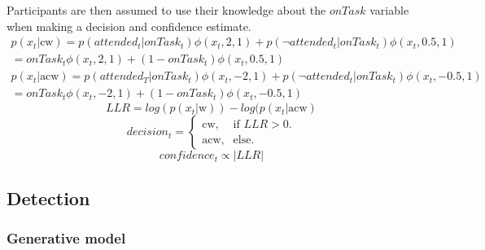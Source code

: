 \documentclass[12pt,twoside]{reedthesis}
\begin{document}
Participants are then assumed to use their knowledge about the \(onTask\) variable when making a decision and confidence estimate.
\begin{equation}
\begin{aligned}
    p(x_t | \text{cw}) = p(attended_t | onTask_t) \phi(x_t,2,1) + p(\neg attended_t | onTask_t) \phi(x_t,0.5,1)\\
    = onTask_t \phi(x_t,2,1) + (1-onTask_t) \phi(x_t,0.5,1)
    \end{aligned}
\end{equation}
\begin{equation}
\begin{aligned}
    p(x_t | \text{acw}) = p(attended_T | onTask_t) \phi(x_t,-2,1) + p(\neg attended_t | onTask_t) \phi(x_t,-0.5,1)\\
    = onTask_t \phi(x_t,-2,1) + (1-onTask_t) \phi(x_t,-0.5,1)
    \end{aligned}
\end{equation}
\begin{equation}
LLR = log(p(x_t | \text{w}))-log(p(x_t | \text{acw})
\end{equation}
\begin{equation}
  decision_t=\begin{cases}
    \text{cw}, & \text{if } LLR>0.\\
   \text{acw}, & \text{else}.
    
  \end{cases}
\end{equation}
\begin{equation}
confidence_t \propto |LLR|
\end{equation}
\hypertarget{detection-5}{%
\subsection{Detection}\label{detection-5}}

\hypertarget{generative-model-7}{%
\subsubsection*{Generative model}\label{generative-model-7}}
\end{document}
